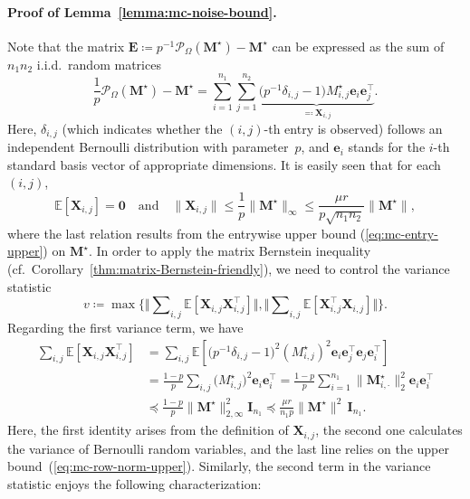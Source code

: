 \paragraph{Proof of Lemma~\ref{lemma:mc-noise-bound}.} Note that the matrix $\bm{E}\coloneqq p^{-1}\mathcal{P}_{\Omega}(\bm{M}^{\star})-\bm{M}^{\star}$
can be expressed as the sum of $n_{1}n_{2}$ i.i.d.~random matrices
%
\[
  \frac{1}{p}  \mathcal{P}_{\Omega}(\bm{M}^{\star})-\bm{M}^{\star}=\sum_{i=1}^{n_{1}}\sum_{j=1}^{n_{2}}\underbrace{\big(p^{-1} \delta_{i,j} -1 \big)M_{i,j}^{\star}\bm{e}_{i}\bm{e}_{j}^{\top}}_{\eqqcolon\bm{X}_{i,j}}.
\]
%
Here, $\delta_{i,j}$ (which indicates whether the $(i,j)$-th entry is observed) follows an independent Bernoulli distribution
with parameter~$p$, and $\bm{e}_{i}$ stands for the $i$-th standard
basis vector of appropriate dimensions. It is easily seen that for each $(i,j)$,
%
\[
	\mathbb{E}[\bm{X}_{i,j}]=\bm{0}\quad\text{and}\quad\|\bm{X}_{i,j}\|\leq  \frac{1}{p} \|\bm{M}^{\star}\|_{\infty}\leq\frac{\mu r}{p\sqrt{n_{1}n_{2}}} \big\| \bm{M}^{\star} \big\|,
\]
%
where the last relation results from the entrywise upper bound (\ref{eq:mc-entry-upper})
on $\bm{M}^{\star}$. In order to apply the matrix Bernstein inequality (cf.~Corollary~\ref{thm:matrix-Bernstein-friendly}),
we need to control the variance statistic
%
\[
	v\coloneqq\max \Big\{ \Big\Vert \sum\nolimits _{i,j}\mathbb{E}\left[\bm{X}_{i,j}\bm{X}_{i,j}^{\top}\right]\Big\Vert ,\Big\Vert \sum\nolimits _{i,j}\mathbb{E}\left[\bm{X}_{i,j}^{\top}\bm{X}_{i,j}\right] \Big\Vert \Big\} .
\]
%
Regarding the first variance term, we have
%
\begin{align*}
\sum\nolimits _{i,j}\mathbb{E}\left[\bm{X}_{i,j}\bm{X}_{i,j}^{\top}\right]
	& =\sum\nolimits _{i,j}\mathbb{E}\left[ \big( p^{-1} \delta_{i,j} -1 \big)^{2}(M_{i,j}^{\star})^{2}\bm{e}_{i}\bm{e}_{j}^{\top}\bm{e}_{j}\bm{e}_{i}^{\top}\right]\\
 & =\frac{1-p}{p}\sum\nolimits _{i,j}\big(M_{i,j}^{\star}\big)^{2}\bm{e}_{i}\bm{e}_{i}^{\top}=\frac{1-p}{p}\sum_{i=1}^{n_{1}}\|\bm{M}_{i,\cdot}^{\star}\|_{2}^{2}\bm{e}_{i}\bm{e}_{i}^{\top} \\
	& \preceq \frac{1-p}{p}  \|\bm{M}^{\star}\|_{2,\infty}^{2} \bm{I}_{n_1} \preceq \frac{\mu r}{n_1p}  \|\bm{M}^{\star}\|^{2} \,\bm{I}_{n_1} .
\end{align*}
%
Here, the first identity arises from the definition of $\bm{X}_{i,j}$,
the second one calculates the variance of Bernoulli random variables,
and the last line relies on the upper bound~(\ref{eq:mc-row-norm-upper}).
Similarly, the second term in the variance statistic enjoys the following characterization:
